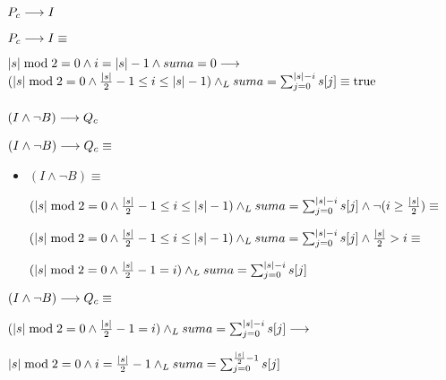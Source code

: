 \documentclass{article}
\begin{document}
\subsubsection*{$P_{c} \longrightarrow I$}

$P_{c} \longrightarrow I \equiv$

$ |s| \bmod 2 = 0 \wedge i = |s| - 1 \wedge suma = 0 \longrightarrow$
$ (|s| \bmod 2 = 0 \wedge \frac{|s|}{2} - 1 \leq i \leq |s| - 1) \land _L suma = \sum_{j=0}^{|s|-i} s[j] \equiv \mathrm{true}$

\subsubsection*{$(I \wedge \neg B) \longrightarrow Q_{c}$}

$ (I \wedge \neg B) \longrightarrow Q_{c} \equiv $

\begin{itemize}
    \item $(I \wedge \neg B) \equiv $

    $ (|s| \bmod 2 = 0 \wedge \frac{|s|}{2} - 1 \leq i \leq |s| - 1) \land _L suma = \sum_{j=0}^{|s|-i} s[j] \wedge \neg (i \geq \frac{|s|}{2}) \equiv$

    $ (|s| \bmod 2 = 0 \wedge \frac{|s|}{2} - 1 \leq i \leq |s| - 1) \land _L suma = \sum_{j=0}^{|s|-i} s[j] \wedge \frac{|s|}{2} > i \equiv$

    $ (|s| \bmod 2 = 0 \wedge \frac{|s|}{2} - 1 = i) \land _L suma = \sum_{j=0}^{|s|-i} s[j] $
\end{itemize}

$ (I \wedge \neg B) \longrightarrow Q_{c} \equiv $

$ (|s| \bmod 2 = 0 \wedge \frac{|s|}{2} - 1 = i) \land _L suma = \sum_{j=0}^{|s|-i} s[j] \longrightarrow$

$ |s| \bmod 2 = 0 \wedge i = \frac{|s|}{2} - 1 \land _L suma = \sum_{j=0}^{\frac{|s|}{2}-1} s[j] $




\end{document}
